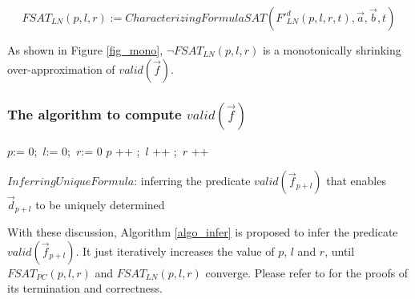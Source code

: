 \documentclass[runningheads,a4paper,orivec]{llncs}
\begin{document}
\begin{equation}\label{fsat_ln}
FSAT_{LN}(p,l,r):=CharacterizingFormulaSAT(F'^d_{LN}(p,l,r,t),\vec{a},\vec{b},t)
\end{equation}

As shown in Figure \ref{fig_mono},
% 
$\neg FSAT_{LN}(p,l,r)$ is a monotonically shrinking over-approximation of $valid(\vec{f})$.




\subsubsection{The algorithm to compute $valid(\vec{f})$}\label{subsub_overal}
\begin{algorithm}[t]
\SetAlgoVlined
$p$:= $0$;~$l$:= $0$;~$r$:= $0$ \;
 {
  $p$ ++ ;~$l$ ++ ;~$r$ ++ \;
}
\caption{$InferringUniqueFormula$: inferring the predicate $valid(\vec{f}_{p+l})$ 
that enables $\vec{d}_{p+l}$ to be uniquely determined}
\label{algo_infer}
\end{algorithm}

With these discussion,
Algorithm \ref{algo_infer} is proposed to infer the predicate $valid(\vec{f}_{p+l})$.
It just iteratively increases the value of $p$, $l$ and $r$, 
until $FSAT_{PC}(p,l,r)$ and $FSAT_{LN}(p,l,r)$ converge.
Please refer to \cite{QinTODAES15} for the proofs of its termination and correctness.
\end{document}
